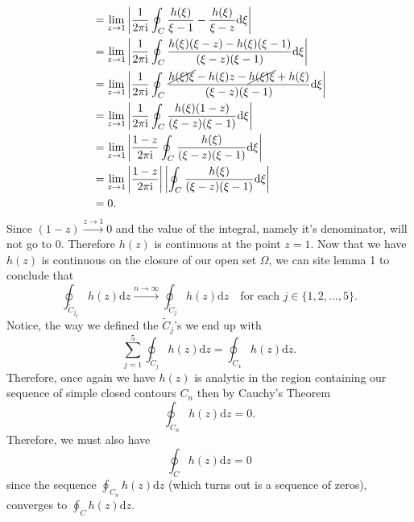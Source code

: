 \documentclass[10pt]{amsart}
\newcommand{\D}{\mathrm{d}}
\newcommand{\I}{\mathrm{i}}
\theoremstyle{nonumberplain}
\begin{document}
\begin{enumerate}[label={\bf {\arabic*}:}]
\begin{itemize}
\begin{align*}
	&= \lim_{z \rightarrow 1} \left| \frac 1 {2\pi \I} \oint_C \frac {h(\xi)}{\xi - 1} -  \frac {h(\xi)}{\xi - z} \D \xi \right| \\
	&= \lim_{z \rightarrow 1} \left| \frac 1 {2\pi \I} \oint_C \frac {h(\xi)(\xi - z) - h(\xi)(\xi - 1)}{(\xi - z)(\xi - 1)} \D \xi \right| \\
	&= \lim_{z \rightarrow 1} \left| \frac 1 {2\pi \I} \oint_C \frac {\cancel{h(\xi)\xi} - h(\xi)z - \cancel{h(\xi)\xi} + h(\xi)}{(\xi - z)(\xi - 1)} \D \xi \right| \\
	&= \lim_{z \rightarrow 1} \left| \frac 1 {2\pi \I} \oint_C \frac {h(\xi)(1 - z)}{(\xi - z)(\xi - 1)} \D \xi \right| \\
	&= \lim_{z \rightarrow 1} \left| \frac {1 - z} {2\pi \I} \oint_C \frac {h(\xi)}{(\xi - z)(\xi - 1)} \D \xi \right| \\
	&= \lim_{z \rightarrow 1} \left| \frac {1 - z} {2\pi \I} \right| \left|\oint_C \frac {h(\xi)}{(\xi - z)(\xi - 1)} \D \xi \right| \\
	&= 0.
\end{align*}
Since $(1-z)\overset{z \to 1}{\longrightarrow} 0$ and the value of the integral, namely it's denominator, will not go to 0.
Therefore $h(z)$ is continuous at the point $z = 1$.
Now that we have $h(z)$ is continuous on the closure of our open set $\Omega$, we can site lemma 1 to conclude that 
$$
\oint_{\widetilde C_{j_k}} h(z) \D z \overset{n\rightarrow \infty}{\longrightarrow} \oint_{\widetilde C_j} h(z) \D z \quad \text{for each } j \in \{1, 2, ..., 5\}.
$$
Notice, the way we defined the $\widetilde C_j$'s we end up with 
$$
\sum_{j=1}^5 \oint_{\widetilde C_j} h(z) \D z = \oint_{C_4} h(z) \D z.
$$
Therefore, once again we have $h(z)$ is analytic in the region containing our sequence of simple closed contours $C_n$ then by Cauchy's Theorem
$$
\oint_{C_n}h(z)\D z = 0.
$$
Therefore, we must also have
$$\oint_{C}h(z)\D z = 0$$
since the sequence $\oint_{C_n}h(z)\D z$ (which turns out is a sequence of zeros), converges to $\oint_{C}h(z)\D z$.


\end{itemize}
\newpage


\end{enumerate}
\end{document}
